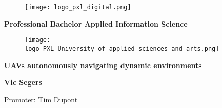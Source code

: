 \begin{titlepage}
  \thispagestyle{titlepage}
  \color{pxlgreen}
  \begin{figure}
    \centering
    \texttt{[image: logo\_pxl\_digital.png]}
  \end{figure}
  \vspace{\baselineskip}
  \begin{center}
    \LARGE\textbf{Professional Bachelor Applied Information Science}
  \end{center}
  \vspace{\baselineskip}
  \begin{figure}[h]
    \centering
    \texttt{[image: logo\_PXL\_University\_of\_applied\_sciences\_and\_arts.png]}
  \end{figure}
  \begin{center}
    \Huge\textbf{UAVs autonomously navigating dynamic environments}
  \end{center}
  \vspace{\baselineskip}
  \begin{center}
    \Large\textbf{Vic Segers}
  \end{center}
  \vspace{\baselineskip}
  \begin{center}
    \large{Promoter: Tim Dupont}
  \end{center}
\end{titlepage}